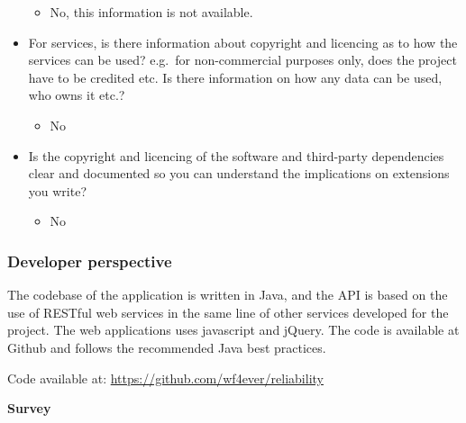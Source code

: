 \begin{itemize}
  \begin{itemize}
  \itemsep1pt\parskip0pt
  \item
    No, this information is not available.
  \end{itemize}
\item
  For services, is there information about copyright and licencing as to
  how the services can be used? e.g.~for non-commercial purposes only,
  does the project have to be credited etc. Is there information on how
  any data can be used, who owns it etc.?

  \begin{itemize}
  \itemsep1pt\parskip0pt
  \item
    No
  \end{itemize}
\item
  Is the copyright and licencing of the software and third-party
  dependencies clear and documented so you can understand the
  implications on extensions you write?

  \begin{itemize}
  \itemsep1pt\parskip0pt
  \item
    No
  \end{itemize}
\end{itemize}

\subsubsection{Developer perspective}

The codebase of the application is written in Java, and the API is based
on the use of RESTful web services in the same line of other services
developed for the project. The web applications uses javascript and
jQuery. The code is available at Github and follows the recommended Java
best practices.

Code available at: \url{https://github.com/wf4ever/reliability}

\textbf{Survey}

